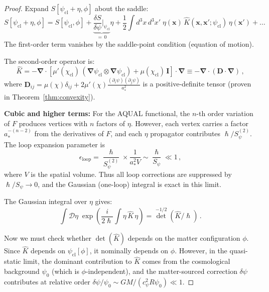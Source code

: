 \documentclass[12pt,a4paper]{article}
\theoremstyle{definition}
\theoremstyle{remark}
\newcommand{\hbar}{\hslash}
\newcommand{\grad}{\boldsymbol{\nabla}}
\newcommand{\Dpath}{\mathcal{D}}
\begin{document}
\begin{proof}
Expand $S[\psi_{\mathrm{cl}} + \eta, \phi]$ about the saddle:
\begin{equation}
S[\psi_{\mathrm{cl}} + \eta, \phi] = S[\psi_{\mathrm{cl}},\phi]
+ \underbrace{\frac{\delta S}{\delta\psi}\bigg|_{\psi_{\mathrm{cl}}}}_{=\,0}\!\!\eta
+ \frac{1}{2}\int d^3x\,d^3x'\;\eta(\mathbf{x})\,
\hat{K}(\mathbf{x},\mathbf{x}';\psi_{\mathrm{cl}})\,\eta(\mathbf{x}') + \ldots
\end{equation}
The first-order term vanishes by the saddle-point condition (equation of motion).

The second-order operator is:
\begin{equation}
\hat{K} = -\grad\cdot\!\left[\mu'(\chi_{\mathrm{cl}})\,
(\grad\psi_{\mathrm{cl}} \otimes \grad\psi_{\mathrm{cl}})
+ \mu(\chi_{\mathrm{cl}})\,\mathbf{I}\right]\cdot\grad \equiv -\grad\cdot(\mathbf{D}\cdot\grad)\,,
\end{equation}
where $\mathbf{D}_{ij} = \mu(\chi)\delta_{ij} + 2\mu'(\chi)\frac{(\partial_i\psi)(\partial_j\psi)}{a_*^2}$
is a positive-definite tensor (proven in Theorem~\ref{thm:convexity}).

\textbf{Cubic and higher terms:} For the AQUAL functional, the $n$-th order
variation of $F$ produces vertices with $n$ factors of $\eta$.  However,
each vertex carries a factor $a_*^{-(n-2)}$ from the derivatives of $F$,
and each $\eta$ propagator contributes $\hbar/S_\psi^{(2)}$.  The loop
expansion parameter is
\begin{equation}
\epsilon_{\mathrm{loop}} = \frac{\hbar}{S_\psi^{(2)}} \times \frac{1}{a_*^2 V}
\sim \frac{\hbar}{S_\psi} \ll 1\,,
\end{equation}
where $V$ is the spatial volume.  Thus all loop corrections are suppressed
by $\hbar/S_\psi \to 0$, and the Gaussian (one-loop) integral is exact in
this limit.

The Gaussian integral over $\eta$ gives:
\begin{equation}
\int \Dpath\eta\;\exp\!\left(\frac{i}{2\hbar}\int\eta\,\hat{K}\,\eta\right)
= \det^{-1/2}(\hat{K}/\hbar)\,.
\end{equation}

Now we must check whether $\det(\hat{K})$ depends on the matter configuration
$\phi$.  Since $\hat{K}$ depends on $\psi_{\mathrm{cl}}[\phi]$, it nominally
depends on $\phi$.  However, in the quasi-static limit, the dominant
contribution to $\hat{K}$ comes from the cosmological background
$\psi_0$ (which is $\phi$-independent), and the matter-sourced correction
$\delta\psi$ contributes at relative order
$\delta\psi/\psi_0 \sim GM/(c_\psi^2 R \psi_0) \ll 1$.


\end{proof}
\end{document}
